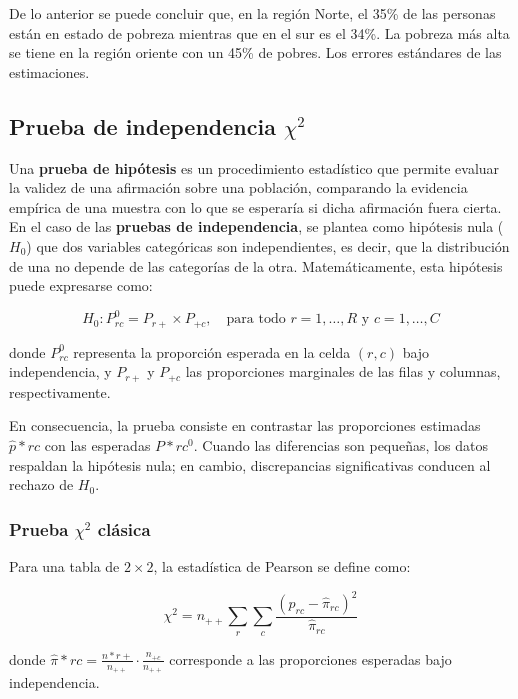 \documentclass[
  12pt,
]{book}
\begin{document}
De lo anterior se puede concluir que, en la región Norte, el 35\% de las personas están en estado de pobreza mientras que en el sur es el 34\%. La pobreza más alta se tiene en la región oriente con un 45\% de pobres. Los errores estándares de las estimaciones.

\subsection{\texorpdfstring{Prueba de independencia \(\chi^{2}\)}{Prueba de independencia \textbackslash chi\^{}\{2\}}}\label{prueba-de-independencia-chi2}

Una \textbf{prueba de hipótesis} es un procedimiento estadístico que permite evaluar la validez de una afirmación sobre una población, comparando la evidencia empírica de una muestra con lo que se esperaría si dicha afirmación fuera cierta. En el caso de las \textbf{pruebas de independencia}, se plantea como hipótesis nula (\(H_{0}\)) que dos variables categóricas son independientes, es decir, que la distribución de una no depende de las categorías de la otra. Matemáticamente, esta hipótesis puede expresarse como:

\[
H_0: P_{rc}^0 = P_{r+} \times P_{+c}, \quad \text{para todo } r = 1,\ldots,R \text{ y } c = 1,\ldots,C
\]

donde \(P_{rc}^0\) representa la proporción esperada en la celda \((r,c)\) bajo independencia, y \(P_{r+}\) y \(P_{+c}\) las proporciones marginales de las filas y columnas, respectivamente.

En consecuencia, la prueba consiste en contrastar las proporciones estimadas \(\hat{p}*{rc}\) con las esperadas \(P*{rc}^0\). Cuando las diferencias son pequeñas, los datos respaldan la hipótesis nula; en cambio, discrepancias significativas conducen al rechazo de \(H_0\).

\subsubsection{\texorpdfstring{Prueba \(\chi^{2}\) clásica}{Prueba \textbackslash chi\^{}\{2\} clásica}}\label{prueba-chi2-cluxe1sica}

Para una tabla de \(2 \times 2\), la estadística de Pearson se define como:

\[
\chi^{2}  =  n_{++}\sum_{r}\sum_{c}\frac{\left(p_{rc}-\hat{\pi}_{rc}\right)^{2}}{\hat{\pi}_{rc}}
\]

donde \(\hat{\pi}*{rc}=\frac{n*{r+}}{n_{++}} \cdot \frac{n_{+c}}{n_{++}}\) corresponde a las proporciones esperadas bajo independencia.
\end{document}
